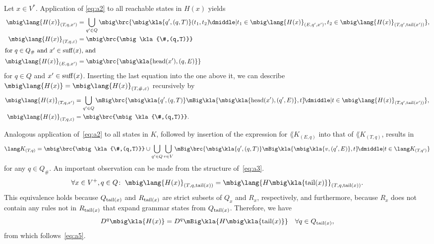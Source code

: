 Let $x\in V^*$. Application of \eqref{eq:a2} to all reachable states in $H(x)$ yields
\begin{align*}
 \mbig\lang{H(x)}_{(T\!,q,x')} &= \bigcup_{q'\in Q}\mbig\brc{\mbig\kla{q',(q,T)}(t_1,t_2) \!\dmiddle| t_1\in\mbig\lang{H(x)}_{(E,q',x')}, t_2\in\mbig\lang{H(x)}_{(T\!,q',\cdr(x'))}}, \\
 \mbig\lang{H(x)}_{(T\!,q,\eps)} &= \mbig\brc{\mbig\kla{\#,(q,T)}} \\
 \intertext{for $q\in Q_\#$ and $x'\in\suff(x)$, and}
 \mbig\lang{H(x)}_{(E,q,x')} &= \mbig\brc{\mbig\kla{\car(x'),(q,E)}}
\end{align*}
for $q\in Q$ and $x'\in\operatorname{suff}(x)$. Inserting the last equation into the one above it, we can describe $\mbig\lang{H(x)} = \mbig\lang{H(x)}_{(T\!,\#,\eps)}$ recursively by
\begin{subequations}\label{eq:a3}\begin{align}
 \mbig\lang{H(x)}_{(T\!,q,x')} &= \bigcup_{q'\in Q}\mBig\brc{\mbig\kla{q',(q,T)}\mBig\kla{\mbig\kla{\car(x'),(q',E)},t} \!\dmiddle| t\in\mbig\lang{H(x)}_{(T\!,q',\cdr(x'))}}, \label{eq:a3a} \\
 \mbig\lang{H(x)}_{(T\!,q,\eps)} &= \mbig\brc{\mbig\kla{\#,(q,T)}}. \label{eq:a3b}
\end{align}\end{subequations}

Analogous application of~\eqref{eq:a2} to all states in $K$, followed by
insertion of the expression for $\lang K_{(E,q)}$ into that of $\lang
K_{(T\!,q)}$, results in
\begin{equation}\label{eq:a4}
 \lang K_{(T\!,q)} = \mbig\brc{\mbig\kla{\#,(q,T)}} \cup \bigcup_{q'\in Q}\bigcup_{v\in V}\mBig\brc{\mbig\kla{q',(q,T)}\mBig\kla{\mbig\kla{v,(q',E)},t} \!\dmiddle| t\in\lang K_{(T\!,q')}}
\end{equation}
for any $q\in Q_\#$. An important observation can be made from the structure of~\eqref{eq:a3}.
\begin{equation}\label{eq:a5}
 \forall x\in V^+, q\in Q\colon\;
 \mbig\lang{H(x)}_{(T,q,\cdr(x))} = \mbig\lang{H\mbig\kla{\cdr(x)}}_{(T,q,\cdr(x))}.
\end{equation}
This equivalence holds because $Q_{\operatorname{tail}(x)}$ and $R_{\operatorname{tail}(x)}$ are strict
subsets of $Q_x$ and $R_x$, respectively, and furthermore, because $R_x$ does
not contain any rules not in $R_{\operatorname{tail}(x)}$ that expand grammar states from
$Q_{\operatorname{tail}(x)}$. Therefore, we have
\[
 D^q\mbig\kla{H(x)} = D^q\mBig\kla{H\mbig\kla{\cdr(x)}} \quad\forall q\in Q_{\cdr(x)},
\]
from which follows~\eqref{eq:a5}.


